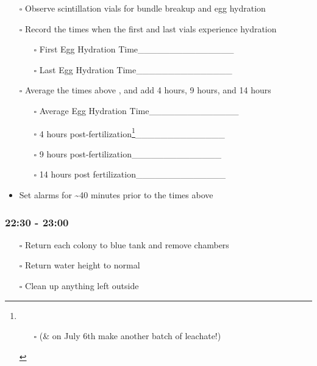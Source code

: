 \documentclass[
  letterpaper,
  DIV=11,
  numbers=noendperiod]{scrartcl}
\providecommand{\tightlist}{%
  \setlength{\itemsep}{0pt}\setlength{\parskip}{0pt}}\usepackage{longtable,booktabs,array}
\begin{document}
\begin{itemize}
\item[$\square$]
  Observe scintillation vials for bundle breakup and egg hydration
\item[$\square$]
  Record the times when the first and last vials experience hydration

  \begin{itemize}
  \item[$\square$]
    First Egg Hydration Time\_\_\_\_\_\_\_\_\_\_\_\_\_\_\_
  \item[$\square$]
    Last Egg Hydration Time\_\_\_\_\_\_\_\_\_\_\_\_\_\_\_
  \end{itemize}
\item[$\square$]
  Average the times above , and add 4 hours, 9 hours, and 14 hours

  \begin{itemize}
  \item[$\square$]
    Average Egg Hydration Time\_\_\_\_\_\_\_\_\_\_\_\_\_\_
  \item[$\square$]
    4 hours post-fertilization\footnote{\begin{itemize}
      \tightlist
      \item[$\square$]
        (\& on July 6th make another batch of leachate!)
      \end{itemize}}\_\_\_\_\_\_\_\_\_\_\_\_\_\_
  \item[$\square$]
    9 hours post-fertilization\_\_\_\_\_\_\_\_\_\_\_\_\_\_
  \item[$\square$]
    14 hours post fertilization\_\_\_\_\_\_\_\_\_\_\_\_\_\_
  \end{itemize}
\item
  Set alarms for \textasciitilde40 minutes prior to the times above
\end{itemize}

\hypertarget{section-5}{%
\subsubsection{22:30 - 23:00}\label{section-5}}

\begin{itemize}
\item[$\square$]
  Return each colony to blue tank and remove chambers
\item[$\square$]
  Return water height to normal
\item[$\square$]
  Clean up anything left outside
\end{itemize}
\end{document}
